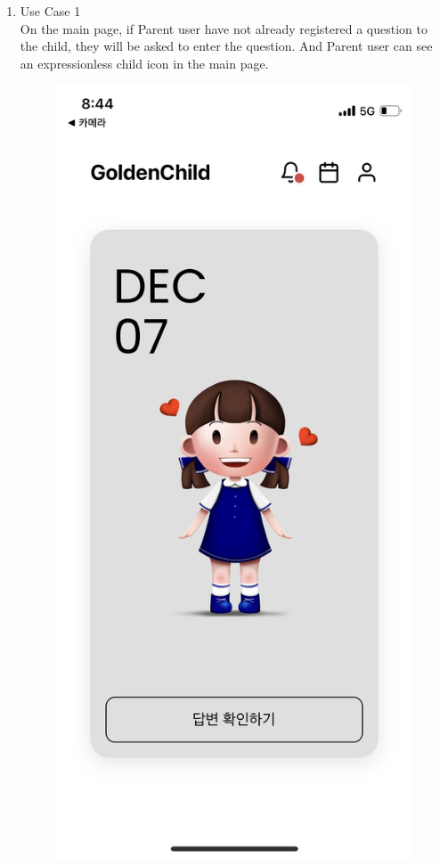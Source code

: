 \documentclass[conference]{IEEEtran}
\begin{document}
\begin{enumerate}
\begin{enumerate}
\begin{figure}[H]
        \end{figure}
        \item Use Case 1
        \\On the main page, if Parent user have not already registered a question to the child, they will be asked to enter the question. And Parent user can see an expressionless child icon in the main page. 
        \begin{figure}[H]
        \centering
        \includegraphics[scale=0.1]{UseCases/20.happyicon.png}

\end{figure}
\end{enumerate}
\end{enumerate}
\end{document}
